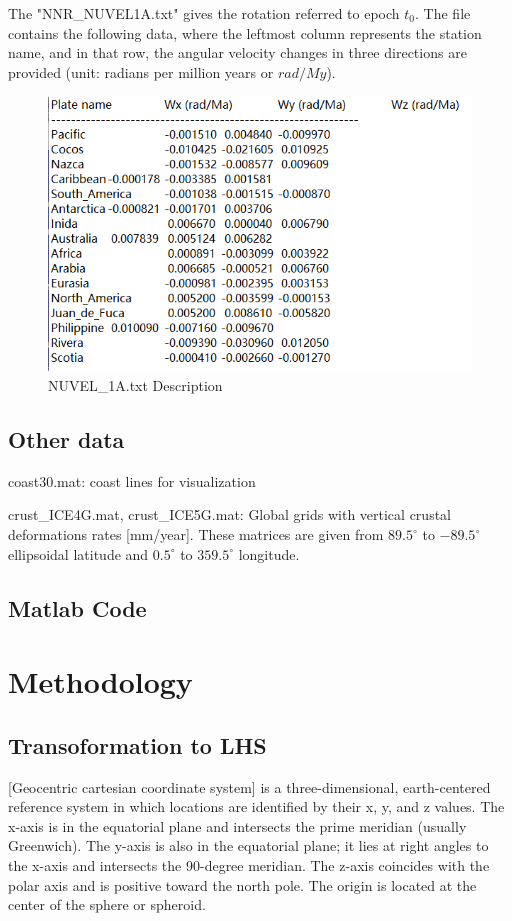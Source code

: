 \documentclass{article}
\begin{document}
The "NNR\_NUVEL1A.txt" gives the rotation referred to epoch $t_0$. 
The file contains the following data, where the leftmost column represents the station name, 
and in that row, the angular velocity changes in three directions are provided (unit: radians per million years or $rad/My$).
\begin{figure}[htbp]
    \centering
    \includegraphics[width=12cm]{../source/nuvel.png}
    \caption{NUVEL\_1A.txt Description}
    \label{fig:Nuvel-1A}
\end{figure}

\subsection{Other data}
\noindent coast30.mat: coast lines for visualization

\noindent crust\_ICE4G.mat, crust\_ICE5G.mat: Global grids with vertical crustal deformations rates [mm/year].
These matrices are given from $89.5^{\circ}$ to $-89.5^{\circ}$ ellipsoidal latitude and $0.5^{\circ}$ to $359.5^{\circ}$ longitude.

\subsection{Matlab Code}

\section{Methodology}
\subsection{Transoformation to LHS}
[Geocentric cartesian coordinate system] is a three-dimensional, earth-centered reference system in which locations are identified by their x, y, and z values. 
The x-axis is in the equatorial plane and intersects the prime meridian (usually Greenwich). 
The y-axis is also in the equatorial plane; it lies at right angles to the x-axis and intersects the 90-degree meridian. 
The z-axis coincides with the polar axis and is positive toward the north pole. The origin is located at the center of the sphere or spheroid.
\end{document}
